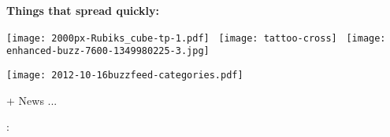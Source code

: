 

  \textbf{Things that spread quickly:}

    \texttt{[image: 2000px-Rubiks\_cube-tp-1.pdf]}
    \ \texttt{[image: tattoo-cross]}
    \ \texttt{[image: enhanced-buzz-7600-1349980225-3.jpg]}

    \bigskip

    \begin{center}
      \texttt{[image: 2012-10-16buzzfeed-categories.pdf]}
    \end{center}

    {
      {\huge
        + News ...
      }
    }

    \vfill 

    :














